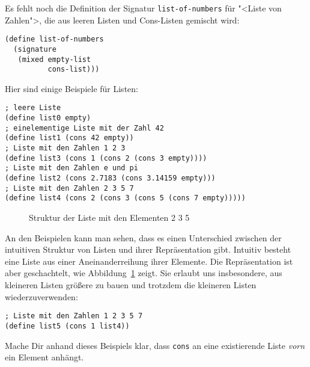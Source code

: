 Es fehlt noch die Definition der Signatur \lstinline{list-of-numbers}
für "<Liste von Zahlen">, die aus leeren Listen und Cons-Listen
gemischt wird:
%
\begin{lstlisting}
(define list-of-numbers
  (signature
   (mixed empty-list
          cons-list)))
\end{lstlisting}
%
Hier sind einige Beispiele für Listen:
%
\begin{lstlisting}
; leere Liste
(define list0 empty)
; einelementige Liste mit der Zahl 42
(define list1 (cons 42 empty))
; Liste mit den Zahlen 1 2 3
(define list3 (cons 1 (cons 2 (cons 3 empty))))
; Liste mit den Zahlen e und pi
(define list2 (cons 2.7183 (cons 3.14159 empty)))
; Liste mit den Zahlen 2 3 5 7
(define list4 (cons 2 (cons 3 (cons 5 (cons 7 empty)))))
\end{lstlisting}
%
\begin{figure}[tb]
  \centering
  
  \caption{Struktur der Liste mit den Elementen 2 3 5}
  \label{fig:list-structure}
\end{figure}
%
\noindent An den Beispielen kann man sehen, dass es einen Unterschied
zwischen der intuitiven Struktur von Listen und ihrer Repräsentation
gibt. Intuitiv besteht eine Liste aus einer Aneinanderreihung ihrer
Elemente.  Die Repräsentation ist aber geschachtelt, wie
Abbildung~\ref{fig:list-structure} zeigt.  Sie erlaubt uns
insbesondere, aus kleineren Listen größere zu bauen und trotzdem die
kleineren Listen wiederzuverwenden:
%
\begin{lstlisting}
; Liste mit den Zahlen 1 2 3 5 7
(define list5 (cons 1 list4))
\end{lstlisting}
%
Mache Dir anhand dieses Beispiels klar, dass \lstinline{cons} an eine
existierende Liste \emph{vorn} ein Element anhängt.


